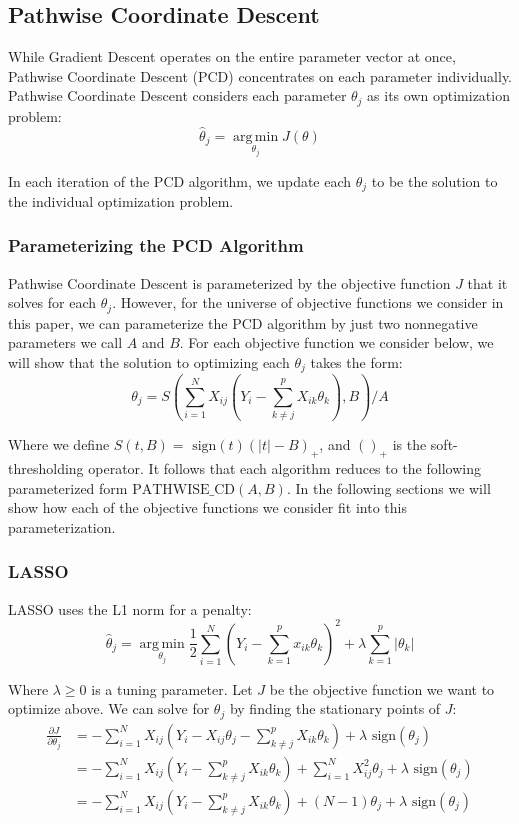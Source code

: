 \documentclass[11pt]{article}
\newcommand{\thh}{\hat{\theta}}
\newcommand{\sgn}{\text{ sign}}
\DeclareMathOperator*{\argmin}{arg\,min}
\newcommand{\pcd}{\text{PATHWISE\_CD}}
\begin{document}
\subsection{Pathwise Coordinate Descent}
While Gradient Descent operates on the entire parameter vector at once, Pathwise Coordinate Descent (PCD) concentrates on each parameter individually.  Pathwise Coordinate Descent considers each parameter $\theta_j$ as its own optimization problem\cite{ht}:
	$$\thh_j = \argmin\limits_{\theta_j} J(\theta)$$

In each iteration of the PCD algorithm, we update each $\theta_j$ to be the solution to the individual optimization problem.  

\subsubsection{Parameterizing the PCD Algorithm}
Pathwise Coordinate Descent is parameterized by the objective function $J$ that it solves for each $\theta_j$.  However, for the universe of objective functions we consider in this paper, we can parameterize the PCD algorithm by just two nonnegative parameters we call $A$ and $B$.  For each objective function we consider below, we will show that the solution to optimizing each $\theta_j$ takes the form:
	$$\theta_j = S\left(\sum\limits_{i=1}^N X_{ij}(Y_i - \sum\limits_{k \ne j}^p X_{ik}\theta_k), B\right)/A$$

Where we define\cite{ht} $S(t,B) = \sgn(t)(|t|-B)_+$, and $()_+$ is the soft-thresholding operator.  It follows that each algorithm reduces to the following parameterized form $\pcd(A, B)$.  In the following sections we will show how each of the objective functions we consider fit into this parameterization.  

\subsubsection{LASSO}
LASSO uses the L1 norm for a penalty:
	$$\thh_j = \argmin\limits_{\theta_j} \frac{1}{2} \sum\limits_{i=1}^N \left(Y_i - \sum\limits_{k=1}^px_{ik}\theta_k \right)^2 + \lambda \sum\limits_{k=1}^p|\theta_k|$$

Where $\lambda \geq 0$ is a tuning parameter.  Let $J$ be the objective function we want to optimize above.  We can solve for $\theta_j$ by finding the stationary points of $J$:
\begin{equation}\begin{split}
	\frac{\partial J}{\partial \theta_j}
		& = -\sum\limits_{i=1}^N X_{ij}(Y_i - X_{ij}\theta_j - \sum\limits_{k \ne j}^p X_{ik}\theta_k) + \lambda \sgn(\theta_j) \\
		& = -\sum\limits_{i=1}^N X_{ij}(Y_i - \sum\limits_{k \ne j}^p X_{ik}\theta_k) + \sum\limits_{i=1}^NX_{ij}^2\theta_j + \lambda \sgn(\theta_j) \\
		& = -\sum\limits_{i=1}^N X_{ij}(Y_i - \sum\limits_{k \ne j}^p X_{ik}\theta_k) +(N-1)\theta_j + \lambda \sgn(\theta_j) \\
\end{split}\end{equation}
\end{document}
